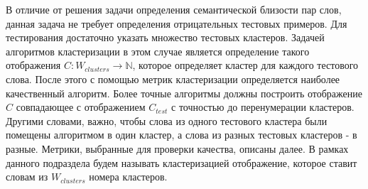 В отличие от решения задачи определения семантической близости пар слов, данная задача не требует определения отрицательных тестовых примеров. Для тестирования достаточно указать множество тестовых кластеров. Задачей алгоритмов кластеризации в этом случае является определение такого отображения $C: W_{clusters} \rightarrow \mathbb{N}$, которое определяет кластер для каждого тестового слова. После этого с помощью метрик кластеризации определяется наиболее качественный алгоритм. Более точные алгоритмы должны построить отображение $C$ совпадающее с отображением $C_{test}$ с точностью до перенумерации кластеров. Другими словами, важно, чтобы слова из одного тестового кластера были помещены алгоритмом в один кластер, а слова из разных тестовых кластеров - в разные. Метрики, выбранные для проверки качества, описаны далее. В рамках данного подраздела будем называть кластеризацией отображение, которое ставит словам из $W_{clusters}$ номера кластеров. 
